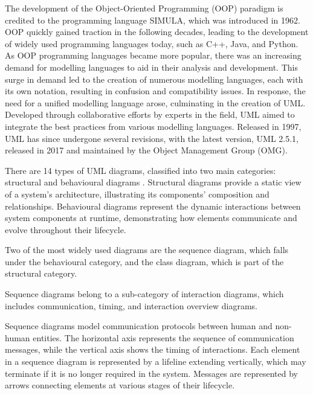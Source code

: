 \documentclass{article}
\newcounter{subsubsubsection}[subsubsection]
\begin{document}
{The development of the Object-Oriented Programming (OOP) paradigm is credited to the programming language SIMULA, which was introduced in 1962\cite{Simula}. OOP quickly gained traction in the following decades, leading to the development of widely used programming languages today, such as C++, Java, and Python\cite{Seidl_Scholz_Huemer_Kappel_Duffy_2014}. As OOP programming languages became more popular, there was an increasing demand for modelling languages to aid in their analysis and development. This surge in demand led to the creation of numerous modelling languages, each with its own notation, resulting in confusion and compatibility issues\cite{Seidl_Scholz_Huemer_Kappel_Duffy_2014}. In response, the need for a unified modelling language arose, culminating in the creation of UML. Developed through collaborative efforts by experts in the field, UML aimed to integrate the best practices from various modelling languages\cite{Seidl_Scholz_Huemer_Kappel_Duffy_2014}. Released in 1997, UML has since undergone several revisions, with the latest version, UML 2.5.1, released in 2017 and maintained by the Object Management Group (OMG)\cite{OMG_UML}.

There are 14 types of UML diagrams, classified into two main categories: structural and behavioural diagrams \cite{Seidl_Scholz_Huemer_Kappel_Duffy_2014}. Structural diagrams provide a static view of a system's architecture, illustrating its components' composition and relationships. Behavioural diagrams represent the dynamic interactions between system components at runtime, demonstrating how elements communicate and evolve throughout their lifecycle. 

Two of the most widely used diagrams are the sequence diagram, which falls under the behavioural category, and the class diagram, which is part of the structural category.


Sequence diagrams belong to a sub-category of interaction diagrams, which includes communication, timing, and interaction overview diagrams\cite{Seidl_Scholz_Huemer_Kappel_Duffy_2014}.

Sequence diagrams model communication protocols between human and non-human entities. The horizontal axis represents the sequence of communication messages, while the vertical axis shows the timing of interactions. Each element in a sequence diagram is represented by a lifeline extending vertically, which may terminate if it is no longer required in the system. Messages are represented by arrows connecting elements at various stages of their lifecycle.

}
\end{document}
